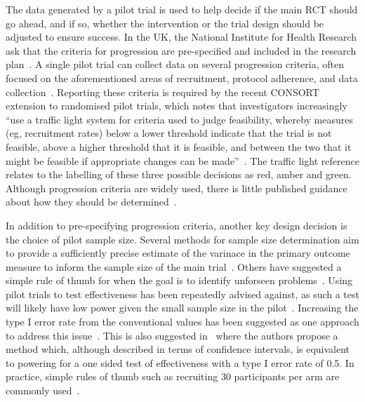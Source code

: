\documentclass[AMA,STIX1COL]{WileyNJD-v2}
\begin{document}

The data generated by a pilot trial is used to help decide if the main RCT should go ahead, and if so, whether the intervention or the trial design should be adjusted to ensure success. In the UK, the National Institute for Health Research ask that the criteria for progression are pre-specified and included in the research plan~\cite{NIHR2017}. A single pilot trial can collect data on several progression criteria, often focused on the aforementioned areas of recruitment, protocol adherence, and data collection~\cite{Avery2017}. Reporting these criteria is required by the recent CONSORT extension to randomised pilot trials, which notes that investigators increasingly ``use a traffic light system for criteria used to judge feasibility, whereby measures (eg, recruitment rates) below a lower threshold indicate that the trial is not feasible, above a higher threshold that it is feasible, and between the two that it might be feasible if appropriate changes can be made''~\cite{Eldridge2016a}. The traffic light reference relates to the labelling of these three possible decisions as red, amber and green. Although progression criteria are widely used, there is little published guidance about how they should be determined~\cite{Avery2017, Hampson2017}.

In addition to pre-specifying progression criteria, another key design decision is the choice of pilot sample size. Several methods for sample size determination aim to provide a sufficiently precise estimate of the varinace in the primary outcome measure to inform the sample size of the main trial~\cite{Browne1995, Julious2005, Sim2012, Teare2014, Eldridge2015, Whitehead2015}. Others have suggested a simple rule of thumb for when the goal is to identify unforseen problems~\cite{Viechtbauer2015}. Using pilot trials to test effectiveness has been repeatedly advised against, as such a test will likely have low power given the small sample size in the pilot~\cite{Lancaster2004, Arain2010, Thabane2010}. Increasing the type I error rate from the conventional values has been suggested as one approach to address this issue~\cite{Lee2014}. This is also suggested in~\cite{Cocks2013} where the authors propose a method which, although described in terms of confidence intervals, is equivalent to powering for a one sided test of effectiveness with a type I error rate of 0.5. In practice, simple rules of thumb such as recruiting 30 participants per arm are commonly used~\cite{Cocks2013, Whitehead2015}.
\end{document}
